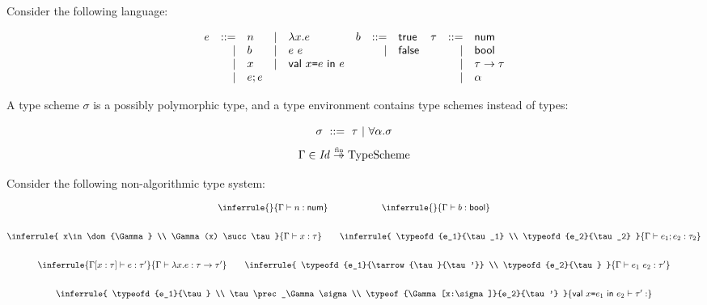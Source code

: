 \begin{exercise}

Consider the following language:

\vspace{-1em}

\[
\begin{array}{rrlrlrrlrrl}
  e &::=& n &|& \lambda x.e & b &::=& \textsf{true} & \tau &::=& \textsf{num} \\
  &|& b &|& e\ e & &|& \textsf{false} &&|& \textsf{bool} \\
  &|& x &|& \textsf{val}\ x\texttt{=} e\ \textsf{in}\ e &&&&&|& \tau\rightarrow\tau \\
  &|& e;e &&&&&&&|& \alpha \\
\end{array}
\]

A type scheme $\sigma$ is a possibly polymorphic type,
and a type environment contains type schemes instead of types:

\vspace{-1em}

\[ \sigma\ ::=\ \tau\ |\ \tforall{\alpha}{\sigma} \]
\[ \Gamma \in \embox{Id}\finto\text{TypeScheme} \]

Consider the following non-algorithmic type system:

\vspace{-1em}

\[
\begin{array}{@{}c@{}}
  \inferrule
  {}
  { \typeofd{n}{\tnum} }
  \qquad
  \qquad
  \qquad
  \inferrule
  {}
  { \typeofd{b}{\tbool} }
  \\[2em]
  \inferrule
  {
    x\in\dom{\Gamma} \\
    \Gamma(x) \succ \tau
  }
  { \typeofd{x}{\tau} }
  \qquad
  \inferrule
  {
    \typeofd{e_1}{\tau_1} \\
    \typeofd{e_2}{\tau_2}
  }
  { \typeofd{\eseq{e_1}{e_2}}{\tau_2} }
  \\[2em]
  \inferrule
  { \typeof{\Gamma[x:\tau]}{e}{\tau'} }
  { \typeofd{\efun{x}{e}}{\tarrow{\tau}{\tau'}} }
  \qquad
  \inferrule
  {
    \typeofd{e_1}{\tarrow{\tau}{\tau'}} \\
    \typeofd{e_2}{\tau}
  }
  { \typeofd{\eapp{e_1}{e_2}}{\tau'} }
  \\[2em]
  \inferrule
  {
    \typeofd{e_1}{\tau} \\
    \tau\prec_\Gamma\sigma \\
    \typeof{\Gamma[x:\sigma]}{e_2}{\tau'}
  }
  { \typeof{\ebind{x}{e_1}{e_2}}{\tau'} }
\end{array}
\]


\end{exercise}
